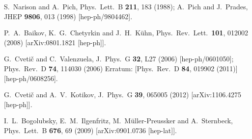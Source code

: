 \documentclass[3p,times,twocolumn]{elsarticle}
\begin{document}
\begin{thebibliography}{999}
  S.~Narison and A.~Pich,
Phys.\ Lett.\ B {\bf 211}, 183 (1988);
A.~Pich and J.~Prades,
 JHEP {\bf 9806}, 013 (1998)
  [hep-ph/9804462].


  P.~A.~Baikov, K.~G.~Chetyrkin and J.~H.~K\"uhn,
 Phys.\ Rev.\ Lett.\  {\bf 101}, 012002 (2008)
  [arXiv:0801.1821 [hep-ph]].

  G.~Cveti\v{c} and C.~Valenzuela,
 J.\ Phys.\ G {\bf 32}, L27 (2006)
  [hep-ph/0601050];
 Phys.\ Rev.\ D {\bf 74}, 114030 (2006)
  Erratum: [Phys.\ Rev.\ D {\bf 84}, 019902 (2011)]
  [hep-ph/0608256].

  G.~Cveti\v{c} and A.~V.~Kotikov,
  J.\ Phys.\ G {\bf 39}, 065005 (2012)
  [arXiv:1106.4275 [hep-ph]].
  
  I.~L.~Bogolubsky, E.~M.~Ilgenfritz, M.~M\"uller-Preussker and A.~Sternbeck, 
  Phys.\ Lett.\ B {\bf 676}, 69 (2009)
  [arXiv:0901.0736 [hep-lat]].
 

\end{thebibliography}
\end{document}
